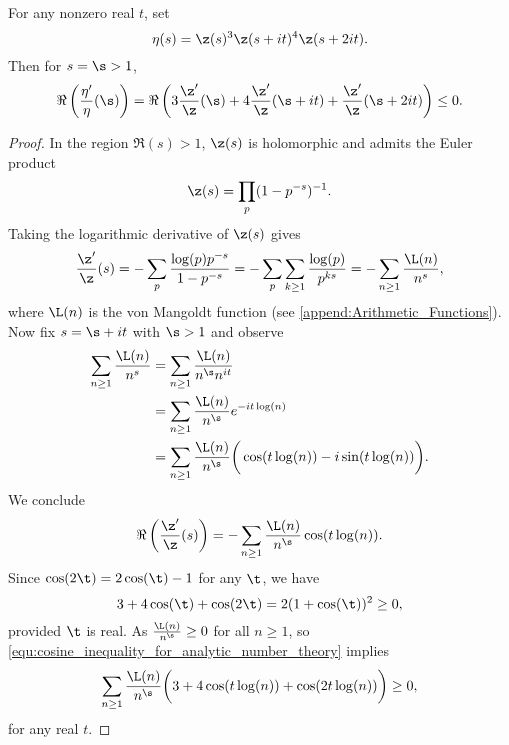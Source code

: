       \begin{lemma}\label{lem:zero-free_region_zeta_lemma}
        For any nonzero real $t$, set
        \[
          \eta(s) = \z(s)^{3}\z(s+it)^{4}\z(s+2it). 
        \]
        Then for $s = \s > 1$,
        \[
          \Re\left(\frac{\eta'}{\eta}(\s)\right) = \Re\left(3\frac{\z'}{\z}(\s)+4\frac{\z'}{\z}(\s+it)+\frac{\z'}{\z}(\s+2it)\right) \le 0.
        \]
      \end{lemma}
      \begin{proof}
        In the region $\Re(s) > 1$, $\z(s)$ is holomorphic and admits the Euler product
        \[
          \z(s) = \prod_{p}(1-p^{-s})^{-1}.
        \]
        Taking the logarithmic derivative of $\z(s)$ gives
        \begin{equation}\label{equ:Drichlet_series_log_derivative_zeta}
          \frac{\z'}{\z}(s) = -\sum_{p}\frac{\log(p)p^{-s}}{1-p^{-s}} = -\sum_{p}\sum_{k \ge 1}\frac{\log(p)}{p^{ks}} = -\sum_{n \ge 1}\frac{\L(n)}{n^{s}},
        \end{equation}
        where $\L(n)$ is the von Mangoldt function (see \cref{append:Arithmetic_Functions}). Now fix $s = \s+it$ with $\s > 1$ and observe
        \begin{align*}
          \sum_{n \ge 1}\frac{\L(n)}{n^{s}} &= \sum_{n \ge 1}\frac{\L(n)}{n^{\s}n^{it}} \\
          &= \sum_{n \ge 1}\frac{\L(n)}{n^{\s}}e^{-it\log(n)} \\
          &= \sum_{n \ge 1}\frac{\L(n)}{n^{\s}}\bigg(\cos(t\log(n))-i\sin(t\log(n))\bigg).
        \end{align*}
        We conclude
        \begin{equation}\label{equ:non-vanishing_of_zeta_on_Re(s)=1_1}
          \Re\left(\frac{\z'}{\z}(s)\right) = -\sum_{n \ge 1}\frac{\L(n)}{n^{\s}}\cos(t\log(n)).
        \end{equation}
        Since $\cos(2\t) = 2\cos(\t)-1$ for any $\t$, we have
        \begin{equation}\label{equ:cosine_inequality_for_analytic_number_theory}
          3+4\cos(\t)+\cos(2\t) = 2(1+\cos(\t))^{2} \ge 0,
        \end{equation}
        provided $\t$ is real. As $\frac{\L(n)}{n^{\s}} \ge 0$ for all $n \ge 1$, so \cref{equ:cosine_inequality_for_analytic_number_theory} implies
        \begin{equation}\label{equ:real_part_eta_zeta_inequality}
          \sum_{n \ge 1}\frac{\L(n)}{n^{\s}}\bigg(3+4\cos(t\log(n))+\cos(2t\log(n))\bigg) \ge 0,
        \end{equation}
        for any real $t$.
      \end{proof}

